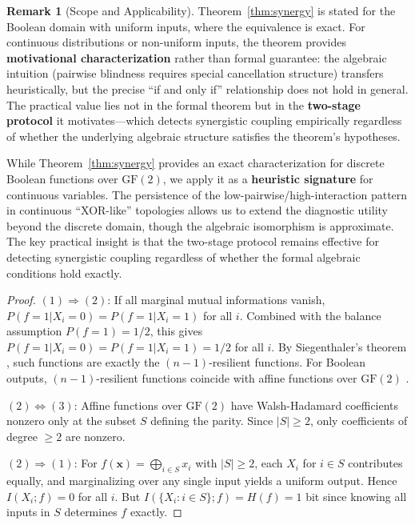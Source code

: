 \documentclass[10pt]{article} %
\theoremstyle{plain}
\theoremstyle{definition}
\newtheorem{remark}[theorem]{Remark}
\begin{document}
\begin{remark}[Scope and Applicability]
\label{rem:scope}
Theorem~\ref{thm:synergy} is stated for the Boolean domain with uniform inputs, where the equivalence is exact. For continuous distributions or non-uniform inputs, the theorem provides \textbf{motivational characterization} rather than formal guarantee: the algebraic intuition (pairwise blindness requires special cancellation structure) transfers heuristically, but the precise ``if and only if'' relationship does not hold in general. The practical value lies not in the formal theorem but in the \textbf{two-stage protocol} it motivates---which detects synergistic coupling empirically regardless of whether the underlying algebraic structure satisfies the theorem's hypotheses.

While Theorem~\ref{thm:synergy} provides an exact characterization for discrete Boolean functions over $\text{GF}(2)$, we apply it as a \textbf{heuristic signature} for continuous variables. The persistence of the low-pairwise/high-interaction pattern in continuous ``XOR-like'' topologies allows us to extend the diagnostic utility beyond the discrete domain, though the algebraic isomorphism is approximate. The key practical insight is that the two-stage protocol remains effective for detecting synergistic coupling regardless of whether the formal algebraic conditions hold exactly.
\end{remark}

\begin{proof}
$(1) \Rightarrow (2)$: If all marginal mutual informations vanish, $P(f = 1 | X_i = 0) = P(f = 1 | X_i = 1)$ for all $i$. Combined with the balance assumption $P(f=1) = 1/2$, this gives $P(f = 1 | X_i = 0) = P(f = 1 | X_i = 1) = 1/2$ for all $i$. By Siegenthaler's theorem \citep{siegenthaler1984correlation}, such functions are exactly the $(n-1)$-resilient functions. For Boolean outputs, $(n-1)$-resilient functions coincide with affine functions over $\text{GF}(2)$ \citep{chor1985resilient}.

$(2) \Leftrightarrow (3)$: Affine functions over $\text{GF}(2)$ have Walsh-Hadamard coefficients nonzero only at the subset $S$ defining the parity. Since $|S| \geq 2$, only coefficients of degree $\geq 2$ are nonzero.

$(2) \Rightarrow (1)$: For $f(\mathbf{x}) = \bigoplus_{i \in S} x_i$ with $|S| \geq 2$, each $X_i$ for $i \in S$ contributes equally, and marginalizing over any single input yields a uniform output. Hence $I(X_i; f) = 0$ for all $i$. But $I(\{X_i : i \in S\}; f) = H(f) = 1$ bit since knowing all inputs in $S$ determines $f$ exactly.
\end{proof}
\end{document}
